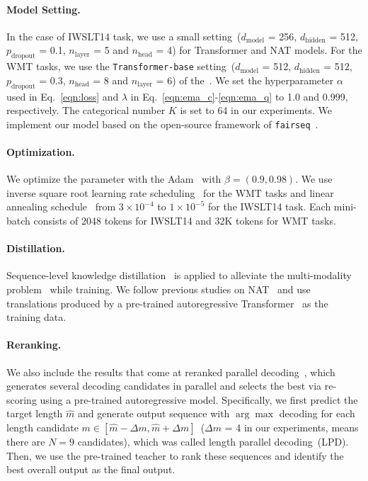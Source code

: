 \paragraph{Model Setting.} 
In the case of IWSLT14 task, we use a small setting~($d_\text{model}$ = 256, $d_\text{hidden}$ = 512, $p_\text{dropout}$ = 0.1, $n_\text{layer}$ = 5 and $n_\text{head}$ = 4) for Transformer and NAT models. 
For the WMT tasks, we use the \texttt{Transformer-base} setting~($d_\text{model}$ = 512, $d_\text{hidden}$ = 512, $p_\text{dropout}$ = 0.3, $n_\text{head}$ = 8 and $n_\text{layer}$ = 6) of the~\citet{transformer}. 
We set the hyperparameter $\alpha$ used in Eq.~\ref{eqn:loss} and $\lambda$ in Eq.~\ref{eqn:ema_c}-\ref{eqn:ema_q} to 1.0 and 0.999, respectively.
The categorical number $K$ is set to 64 in our experiments.
We implement our model based on the open-source framework of \texttt{fairseq}~\cite{fairseq}.

\paragraph{Optimization.} 
We optimize the parameter with the Adam~\citep{adam} with $\beta=(0.9,0.98)$. 
We use inverse square root learning rate scheduling~\citep{transformer} for the WMT tasks and linear annealing schedule~\cite{iter_nat} from $3\times10^{-4}$ to $1\times10^{-5}$ for the IWSLT14 task.
Each mini-batch consists of 2048 tokens for IWSLT14 and 32K tokens for WMT tasks.

\paragraph{Distillation.}
Sequence-level knowledge distillation~\citep{hinton2015distilling} is applied to alleviate the multi-modality problem~\cite{nat} while training. 
We follow previous studies on NAT~\citep{nat,iter_nat,imitate_nat} and use translations produced by a pre-trained autoregressive Transformer~\cite{transformer} as the training data.

\paragraph{Reranking.}
We also include the results that come at reranked parallel decoding~\citep{nat,enat,nat_reg,imitate_nat}, which generates several decoding candidates in parallel and selects the best via re-scoring using a pre-trained autoregressive model. 
Specifically, we first predict the target length $\hat{m}$ and generate output sequence with $\arg\max$ decoding for each length candidate $m \in [\hat{m}-\Delta m, \hat{m}+\Delta m ]$~($\Delta m$ = 4 in our experiments, means there are $N=9$ candidates), which was called length parallel decoding~(LPD). 
Then, we use the pre-trained teacher to rank these sequences and identify the best overall output as the final output.

